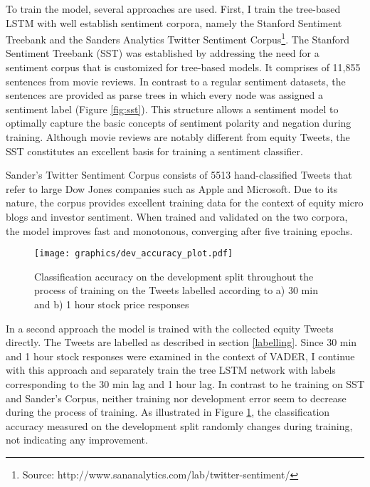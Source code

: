 \documentclass[a4paper,12pt]{article}%
\begin{document}
To train the model, several approaches are used. First, I train the tree-based LSTM with well establish sentiment corpora, namely the Stanford Sentiment Treebank and the Sanders Analytics Twitter Sentiment Corpus\footnote{Source: http://www.sananalytics.com/lab/twitter-sentiment/}. 
The Stanford Sentiment Treebank (SST) was established by \citet{Socher2013} addressing the need for a sentiment corpus that is customized for tree-based models. It comprises of 11,855 sentences from movie reviews. In contrast to a regular sentiment datasets, the sentences are provided as parse trees in which every node was assigned a sentiment label (Figure \ref{fig:sst}). This structure allows a sentiment model to optimally capture the basic concepts of sentiment polarity and negation during training. Although movie reviews are notably different from equity Tweets, the SST constitutes an excellent basis for training a sentiment classifier.

Sander's Twitter Sentiment Corpus consists of 5513 hand-classified Tweets that refer to large Dow Jones companies such as Apple and Microsoft. Due to its nature, the corpus provides excellent training data for the context of equity micro blogs and investor sentiment. When trained and validated on the two corpora, the model improves fast and monotonous, converging after five training epochs.

\begin{figure}
\captionsetup{justification=centering}
\centering
\texttt{[image: graphics/dev\_accuracy\_plot.pdf]}
\caption[Classification Accuracy Throughout The Training]{Classification accuracy on the development split throughout the process of training on the Tweets labelled according to a) 30 min and b) 1 hour stock price responses \label{fig:dev_accuracy}}
\end{figure}


In a second approach the model is trained with the collected equity Tweets directly. The Tweets are labelled as described in section \ref{labelling}. Since 30 min and 1 hour stock responses were examined in the context of VADER, I continue with this approach and separately train the tree LSTM network with labels corresponding to the 30 min lag and 1 hour lag. In contrast to he training on SST and Sander's Corpus, neither training nor development error seem to decrease during the process of training. As illustrated in Figure \ref{fig:dev_accuracy}, the classification accuracy measured on the development split randomly changes during training, not indicating any improvement.
\end{document}
